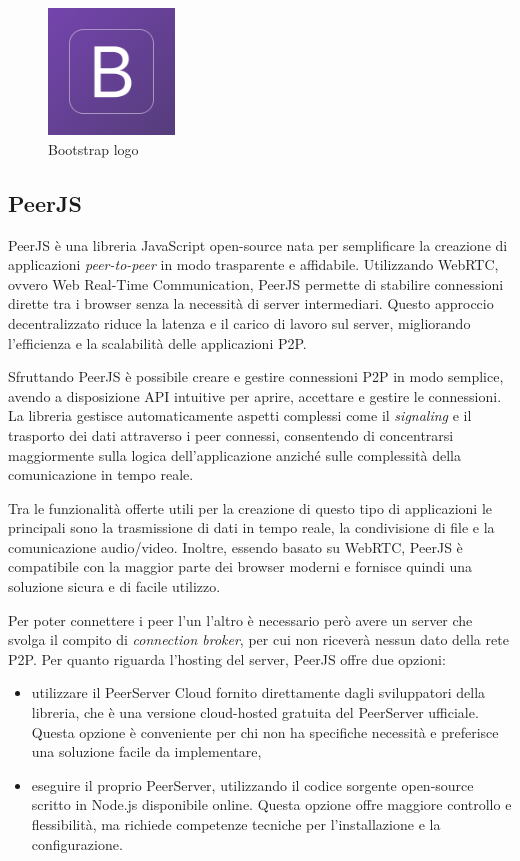 \begin{figure}[H]
\centering
\includegraphics[width=0.3\textwidth]{img/logos/bootstrap_logo.png}
\caption{Bootstrap logo}
\label{fig:bootstrap}
\end{figure}


\subsection{PeerJS}

PeerJS è una libreria JavaScript open-source nata per semplificare la creazione di applicazioni \emph{peer-to-peer} in modo trasparente e affidabile. Utilizzando WebRTC, ovvero Web Real-Time Communication, PeerJS permette di stabilire connessioni dirette tra i browser senza la necessità di server intermediari. Questo approccio decentralizzato riduce la latenza e il carico di lavoro sul server, migliorando l'efficienza e la scalabilità delle applicazioni P2P.

Sfruttando PeerJS è possibile creare e gestire connessioni P2P in modo semplice, avendo a disposizione API intuitive per aprire, accettare e gestire le connessioni. La libreria gestisce automaticamente aspetti complessi come il \emph{signaling} e il trasporto dei dati attraverso i peer connessi, consentendo di concentrarsi maggiormente sulla logica dell'applicazione anziché sulle complessità della comunicazione in tempo reale.

Tra le funzionalità offerte utili per la creazione di questo tipo di applicazioni le principali sono la trasmissione di dati in tempo reale, la condivisione di file e la comunicazione audio/video. Inoltre, essendo basato su WebRTC, PeerJS è compatibile con la maggior parte dei browser moderni e fornisce quindi una soluzione sicura e di facile utilizzo.

Per poter connettere i peer l'un l'altro è necessario però avere un server che svolga il compito di \emph{connection broker}, per cui non riceverà nessun dato della rete P2P. Per quanto riguarda l'hosting del server, PeerJS offre due opzioni:
\begin{itemize}
    \item utilizzare il PeerServer Cloud fornito direttamente dagli sviluppatori della libreria, che è una versione cloud-hosted gratuita del PeerServer ufficiale. Questa opzione è conveniente per chi non ha specifiche necessità e preferisce una soluzione facile da implementare,
    \item eseguire il proprio PeerServer, utilizzando il codice sorgente open-source scritto in Node.js disponibile online. Questa opzione offre maggiore controllo e flessibilità, ma richiede competenze tecniche per l'installazione e la configurazione.
\end{itemize}

